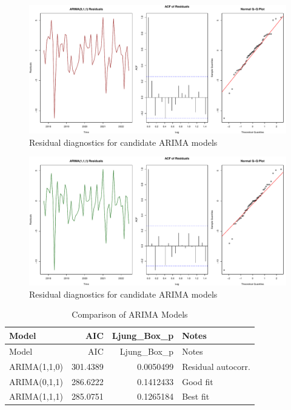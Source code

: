 \documentclass[
  11pt,
]{article}
\begin{document}
\begin{figure}[H]

{\centering \includegraphics{project_files/figure-pdf/fig-arima-diagnostics-2.pdf}

}

\caption{Residual diagnostics for candidate ARIMA models}

\end{figure}%

\begin{figure}[H]

{\centering \includegraphics{project_files/figure-pdf/fig-arima-diagnostics-3.pdf}

}

\caption{Residual diagnostics for candidate ARIMA models}

\end{figure}%

\begin{longtable}[]{@{}lrrl@{}}
\caption{Comparison of ARIMA Models}\tabularnewline
\toprule\noalign{}
Model & AIC & Ljung\_Box\_p & Notes \\
\midrule\noalign{}
\endfirsthead
\toprule\noalign{}
Model & AIC & Ljung\_Box\_p & Notes \\
\midrule\noalign{}
\endhead
\bottomrule\noalign{}
\endlastfoot
ARIMA(1,1,0) & 301.4389 & 0.0050499 & Residual autocorr. \\
ARIMA(0,1,1) & 286.6222 & 0.1412433 & Good fit \\
ARIMA(1,1,1) & 285.0751 & 0.1265184 & Best fit \\
\end{longtable}
\end{document}
